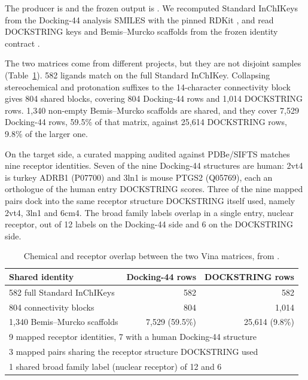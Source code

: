 
The producer is  and the frozen output is
. We recomputed Standard InChIKeys from
the Docking-44 analysis SMILES with the pinned RDKit \cite{rdkit2025}, and read DOCKSTRING keys
and Bemis--Murcko scaffolds \cite{murcko1996} from the frozen identity contract
.

The two matrices come from different projects, but they are not disjoint samples
(Table~\ref{tab:s1overlap}). 582 ligands match on the full Standard InChIKey. Collapsing
stereochemical and protonation suffixes to the 14-character connectivity block gives 804 shared
blocks, covering 804 Docking-44 rows and 1{,}014 DOCKSTRING rows. 1{,}340 non-empty
Bemis--Murcko scaffolds are shared, and they cover 7{,}529 Docking-44 rows, 59.5\% of that
matrix, against 25{,}614 DOCKSTRING rows, 9.8\% of the larger one.

On the target side, a curated mapping audited against PDBe/SIFTS \cite{dana2019sifts} matches nine receptor
identities. Seven of the nine Docking-44 structures are human: 2vt4 is turkey ADRB1 (P07700)
and 3ln1 is mouse PTGS2 (Q05769), each an orthologue of the human entry DOCKSTRING scores.
Three of the nine mapped pairs dock into the same receptor structure DOCKSTRING itself used,
namely 2vt4, 3ln1 and 6cm4. The broad family labels overlap in a single entry, nuclear
receptor, out of 12 labels on the Docking-44 side and 6 on the DOCKSTRING side.

\begin{table}[htbp]
\centering
\caption{Chemical and receptor overlap between the two Vina matrices, from
\protect{}.}
\label{tab:s1overlap}
\small
\begin{tabular}{lrr}
\toprule
Shared identity & Docking-44 rows & DOCKSTRING rows \\
\midrule
582 full Standard InChIKeys & 582 & 582 \\
804 connectivity blocks & 804 & 1{,}014 \\
1{,}340 Bemis--Murcko scaffolds & 7{,}529 (59.5\%) & 25{,}614 (9.8\%) \\
\midrule
\multicolumn{3}{l}{9 mapped receptor identities, 7 with a human Docking-44 structure} \\
\multicolumn{3}{l}{3 mapped pairs sharing the receptor structure DOCKSTRING used} \\
\multicolumn{3}{l}{1 shared broad family label (nuclear receptor) of 12 and 6} \\
\bottomrule
\end{tabular}
\end{table}


